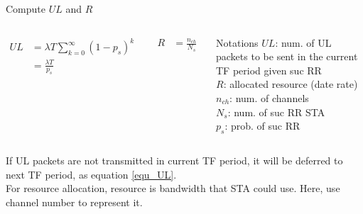 \documentclass[10pt]{beamer}
\begin{document}
\begin{frame}{Compute $UL$ and $R$}
  \begin{columns}[T,onlytextwidth]
	\begin{align}
	UL  &= \lambda T \sum_{k=0}^{\infty} (1-p_s)^k \nonumber\\ 
		&= \frac{\lambda T}{p_s} 
	\label{equ_UL}
	\end{align}
	
	\begin{align}
	\label{equ_R}
	R   &= \frac{n_{ch}}{N_s}
	\end{align}

\begin{alertblock}{Notations}
    $UL$: num. of UL packets to be sent in the current TF period given suc RR\\
    $R$: allocated resource  (date rate)\\
    $n_{ch}$: num. of channels\\
    $N_s$: num. of suc RR STA \\
    $p_s$: prob. of suc RR 
\end{alertblock}
\end{columns}
If UL packets are not transmitted in current TF period, it will be deferred to next TF period, as equation \ref{equ_UL}.\\
For resource allocation, resource is bandwidth that STA could use. Here, use channel number to represent it.  

\end{frame}
\end{document}
